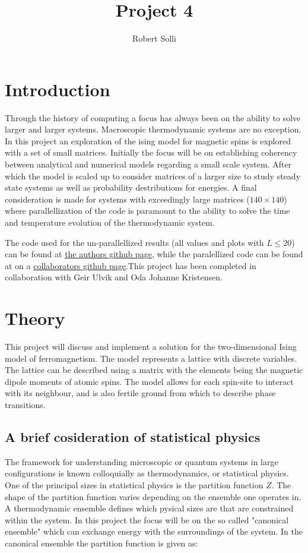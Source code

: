 \documentclass[12pt]{article}
\begin{document}
\title{Project 4}
\author{Robert Solli}
\maketitle

\section{Introduction}
Through the history of computing a focus has always been on the ability to solve larger and larger systems. Macroscopic thermodynamic systems are no exception. In this project an exploration of the ising model for magnetic spins is explored with a set of small matrices. Initially the focus will be on establishing coherency between analytical and numerical models regarding a small scale system. After which the model is scaled up to consider matrices of a larger size to study steady state systems as well as probability destributions for energies. A final consideration is made for systems with exceedingly large matrices ($140 \times 140$) where parallellization of the code is paramount to the ability to solve the time and temperature evolution of the thermodynamic system.


The code used for the un-parallellized results (all values and plots with $L\leq 20$) can be found at \href{https://github.com/copperwire/project4}{the authors github page}, while the paralellized code can be found at on a \href{https://github.com/geirtul/fys4150_project4}{collaborators github page}.This project has been completed in collaboration with Geir Ulvik and Oda Johanne Kristensen.

\section{Theory}
This project will discuss and implement a solution for the two-dimensional Ising model of ferromagnetism. The model represents a lattice with discrete variables. The lattice can be described using a matrix with the elements being the magnetic dipole moments of atomic spins. The model allows for each spin-site to interact with its neighbour, and is also fertile ground from which to describe phase transitions.

\subsection{A brief cosideration of statistical physics}
The framework for understanding microscopic or quantum systems in large configurations is known colloquially as thermodynamics, or statistical physics. One of the principal sizes in statistical physics  is the partition function $Z$. The shape of the partition function varies depending on the ensemble one operates in. A thermodynamic ensemble defines which pysical sizes are that are constrained within the system. In this project the focus will be on the so called "canonical ensemble" which can exchange energy with the surroundings of the system. In the canonical ensemble the partition function is given as:
\end{document}
